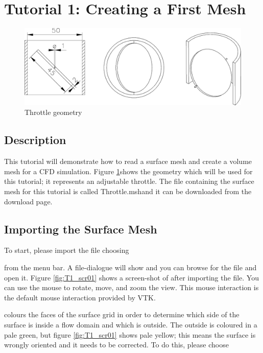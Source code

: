 \section{Tutorial 1: Creating a First Mesh}

\begin{figure}
\begin{centering}
\includegraphics{figures/Throttle}
\par\end{centering}
\caption{Throttle geometry}
\label{fig:throttle1}
\end{figure}

\subsection{Description}

This tutorial will demonstrate how to read a surface mesh and create a volume mesh for a CFD simulation. Figure \ref{fig:throttle1}shows the geometry which will be used for this tutorial; it represents an adjustable throttle. The file containing the surface mesh for this tutorial is called \sqt Throttle.msh\eqt and it can be downloaded from the \eg download page. 

\subsection{Importing the Surface Mesh}
To start, please import the file choosing 


from the menu bar. A file-dialogue will show and you can browse for the file and open it. Figure \ref{fig:T1_scr01} shows a screen-shot of \eg after importing the file. You can use the mouse to rotate, move, and zoom the view. This mouse interaction is the default mouse interaction provided by VTK.

\eg colours the faces of the surface grid in order to determine which side of the surface is inside a flow domain and which is outside. The outside is coloured in a pale green, but figure \ref{fig:T1_scr01} shows pale yellow; this means the surface is wrongly oriented and it needs to be corrected. To do this, please choose 

